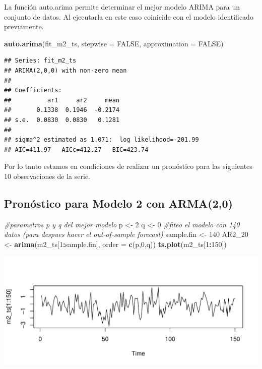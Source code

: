 \documentclass[
  11pt,
]{article}
\newenvironment{Shaded}{\begin{snugshade}}{\end{snugshade}}
\newcommand{\CommentTok}[1]{\textcolor[rgb]{0.56,0.35,0.01}{\textit{#1}}}
\newcommand{\DataTypeTok}[1]{\textcolor[rgb]{0.13,0.29,0.53}{#1}}
\newcommand{\DecValTok}[1]{\textcolor[rgb]{0.00,0.00,0.81}{#1}}
\newcommand{\KeywordTok}[1]{\textcolor[rgb]{0.13,0.29,0.53}{\textbf{#1}}}
\newcommand{\NormalTok}[1]{#1}
\newcommand{\OperatorTok}[1]{\textcolor[rgb]{0.81,0.36,0.00}{\textbf{#1}}}
\newcommand{\OtherTok}[1]{\textcolor[rgb]{0.56,0.35,0.01}{#1}}
\newcommand{\StringTok}[1]{\textcolor[rgb]{0.31,0.60,0.02}{#1}}
\begin{document}
La función auto.arima permite determinar el mejor modelo ARIMA para un
conjunto de datos. Al ejecutarla en este caso coinicide con el modelo
identificado previamente.

\begin{Shaded}
\begin{Highlighting}[]
  \KeywordTok{auto.arima}\NormalTok{(fit_m2_ts, }\DataTypeTok{stepwise =} \OtherTok{FALSE}\NormalTok{, }\DataTypeTok{approximation =} \OtherTok{FALSE}\NormalTok{)}
\end{Highlighting}
\end{Shaded}

\begin{verbatim}
## Series: fit_m2_ts 
## ARIMA(2,0,0) with non-zero mean 
## 
## Coefficients:
##          ar1     ar2     mean
##       0.1338  0.1946  -0.2174
## s.e.  0.0830  0.0830   0.1281
## 
## sigma^2 estimated as 1.071:  log likelihood=-201.99
## AIC=411.97   AICc=412.27   BIC=423.74
\end{verbatim}

Por lo tanto estamos en condiciones de realizar un pronóstico para las
siguientes 10 observaciones de la serie.

\hypertarget{pronuxf3stico-para-modelo-2-con-arma20}{%
\subsection{Pronóstico para Modelo 2 con
ARMA(2,0)}\label{pronuxf3stico-para-modelo-2-con-arma20}}

\begin{Shaded}
\begin{Highlighting}[]
\CommentTok{#parametros p y q del mejor modelo}
\NormalTok{p <-}\StringTok{ }\DecValTok{2}
\NormalTok{q <-}\StringTok{ }\DecValTok{0}
\CommentTok{#fiteo el modelo con 140 datos (para despues hacer el out-of-sample forecast)}
\NormalTok{sample.fin <-}\StringTok{ }\DecValTok{140}
\NormalTok{AR2_}\DecValTok{20}\NormalTok{ <-}\StringTok{ }\KeywordTok{arima}\NormalTok{(m2_ts[}\DecValTok{1}\OperatorTok{:}\NormalTok{sample.fin], }\DataTypeTok{order =} \KeywordTok{c}\NormalTok{(p,}\DecValTok{0}\NormalTok{,q))}
\KeywordTok{ts.plot}\NormalTok{(m2_ts[}\DecValTok{1}\OperatorTok{:}\DecValTok{150}\NormalTok{])}
\end{Highlighting}
\end{Shaded}

\begin{center}\includegraphics[width=0.9\linewidth]{RmdFigs/fit_1_m2-1} \end{center}
\end{document}
